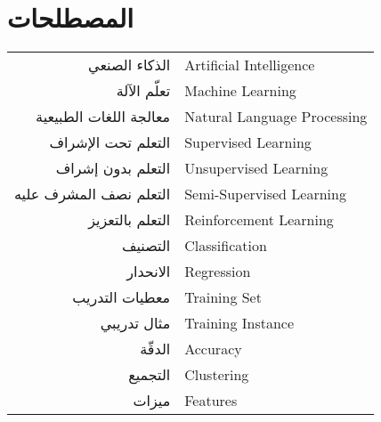 

\chapter*{المصطلحات}

\begin{doublespacing}
	\begin{center}
		\begin{tabular}{r l}
			
			\indent
			الذكاء الصنعي 			&		 	\textenglish{Artificial Intelligence}			\\
			
			\indent
			تعلّم الآلة	 			& 			\textenglish{Machine Learning}			\\
			
			\indent
			معالجة اللغات الطبيعية		& 			\textenglish{Natural Language Processing}	\\
			
			\indent
			التعلم تحت الإشراف		& 			\textenglish{Supervised Learning}	\\
			
			\indent
			التعلم بدون إشراف		& 			\textenglish{Unsupervised Learning}	\\
			
			\indent
			التعلم نصف المشرف عليه		& 			\textenglish{Semi-Supervised Learning}	\\
			
			\indent
			التعلم بالتعزيز		& 			\textenglish{Reinforcement Learning}	\\
			
			\indent
			التصنيف		& 			\textenglish{Classification}	\\
			
			\indent
			الانحدار		& 			\textenglish{Regression}	\\
			
			\indent
			معطيات التدريب		& 			\textenglish{Training Set}	\\
			
			\indent
			مثال تدريبي		& 			\textenglish{Training Instance}	\\
			
			\indent
			الدقّة			& 			\textenglish{Accuracy}				\\
			
			\indent
			التجميع		& 			\textenglish{Clustering}				\\
			
			\indent
			ميزات			& 				\textenglish{Features}				\\
			

\end{tabular}
\end{center}
\end{doublespacing}
